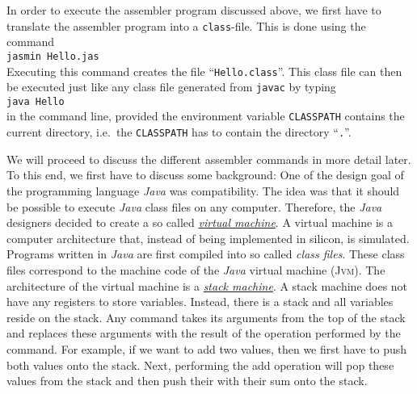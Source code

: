 In order to execute the assembler program discussed above, we first have to translate the assembler
program into a \texttt{class}-file.  This is done using the command
\\[0.2cm]
\hspace*{1.3cm}
\texttt{jasmin Hello.jas}
\\[0.2cm]
Executing this command creates the file ``\texttt{Hello.class}''.  This class file
can then be executed just like any class file generated from \texttt{javac} by typing
\\[0.2cm]
\hspace*{1.3cm}
\texttt{java Hello}
\\[0.2cm]
in the command line, provided the environment variable \texttt{CLASSPATH} contains the current
directory, i.e.~the \texttt{CLASSPATH} has to contain the directory ``\texttt{.}''.

We will proceed to discuss the different assembler commands in more detail later.  To this end, we
first have to discuss some background: One of the design goal of the programming language
\textsl{Java} was compatibility.  The idea was 
that it should be possible to execute \textsl{Java} class files on any computer.  Therefore, the
\textsl{Java} designers decided to create a so called 
\href{http://en.wikipedia.org/wiki/Virtual_machine}{\emph{virtual machine}}.  A virtual machine is
a computer architecture that, instead of being implemented in silicon, is simulated. 
Programs written in \textsl{Java} are first compiled into so called \emph{class files}.  These class
files correspond to the machine code of the \textsl{Java} virtual machine (\textsc{Jvm}).  
The architecture of the virtual machine is a 
\href{http://en.wikipedia.org/wiki/Stack_machine}{\emph{stack machine}}. 
A stack machine does not have any registers to store variables.  Instead, there is a stack and all
variables reside on the stack.  Any command takes its arguments from the top of the stack and
replaces these arguments with the result of the operation performed by the command.
For example, if we want to add two values, then we first have to
push both values onto the stack.  Next, performing the add operation will pop these values from the
stack and then push their with their sum onto the stack.


